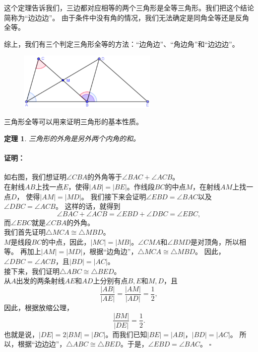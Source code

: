 \documentclass[12pt,UTF8]{ctexbook}
\newtheorem{tm}{定理}[section]
\newenvironment{proof2}{\paragraph{\textbf{证明：}}}{\hfill$\square$}
\begin{document}
这个定理告诉我们，三边都对应相等的两个三角形是全等三角形。我们把这个结论简称为“边边边”。
由于条件中没有角的情况，我们无法确定是同角全等还是反角全等。

综上，我们有三个判定三角形全等的方法：“边角边”、“角边角”和“边边边”。

\begin{figure} %
    \vspace{-15pt}
    \centering
    \includegraphics[width=0.6\textwidth]{三角形5.png}
\end{figure}

三角形全等可以用来证明三角形的基本性质。

\begin{tm}\label{tm:3-0-5}
    三角形的外角是另外两个内角的和。
\end{tm}

\begin{proof2}
    如右图，我们想证明$\angle CBA$的外角等于$\angle BAC + \angle ACB$。\\
    在射线$AB$上找一点$E$，使得$|AB| = |BE|$。作线段$BC$的中点$M$，在射线$AM$上找一点$D$，
    使得$|AM| = |MD|$。
    我们接下来会证明$\angle EBD = \angle BAC$以及$\angle DBC = \angle ACB$。
    这样的话，就得到
    $$\angle BAC + \angle ACB = \angle EBD + \angle DBC = \angle EBC,$$
    而$\angle EBC$就是$\angle CBA$的外角。\\
    我们首先证明$\triangle MCA \cong \triangle MBD$。\\
    $M$是线段$BC$的中点，因此，$|MC| = |MB|$。$\angle CMA$和$\angle BMD$是对顶角，所以相等。
    再加上$|AM| = |MD|$，根据“边角边”，$\triangle MCA \cong \triangle MBD$。
    因此，$\angle DBC = \angle ACB$，且$|BD| = |AC|$。\\
    接下来，我们证明$\triangle ABC \cong \triangle BED$。\\
    从$A$出发的两条射线$AE$和$AD$上分别有点$B,E$和$M,D$，且
    $$ \frac{|AB|}{|AE|} = \frac{|AM|}{|AD|} = \frac12,$$
    因此，根据放缩公理，
    $$ \frac{|BM|}{|DE|} = \frac12.$$
    也就是说，$|DE| = 2|BM| = |BC|$。而我们已知$|BE| = |AB|$，$|BD| = |AC|$。
    所以，根据“边边边”，$\triangle ABC \cong \triangle BED$。于是，$\angle EBD = \angle BAC$。
\end{proof2}
\end{document}
